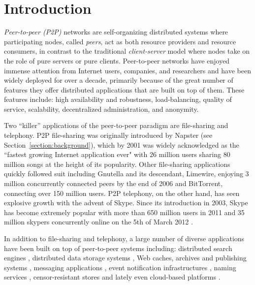 \section{Introduction}
\label{section:intro}

\emph{Peer-to-peer (P2P)} networks are self-organizing distributed systems where
participating nodes, called \emph{peers}, act as both resource providers and
resource consumers, in contrast to the traditional \emph{client-server} model
where nodes take on the role of pure servers or pure clients. Peer-to-peer
networks have enjoyed immense attention from Internet users, companies, and
researchers and have been widely deployed for over a decade, primarily because
of the great number of features they offer distributed applications that are
built on top of them. These features include:  high availability and robustness,
load-balancing, quality of service, scalability, decentralized administration,
and anonymity. 

Two ``killer'' applications of the peer-to-peer paradigm are 
file-sharing and telephony. P2P file-sharing was originally introduced by
Napster (see Section~\ref{section:background}), which by 2001 was widely
acknowledged as the ``fastest growing Internet application ever" with 26 million
users sharing 80 million songs at the height of its popularity. Other file-sharing 
applications quickly followed suit including Gnutella and its descendant,
Limewire, enjoying 3 million concurrently connected peers by the end of 2006
and BitTorrent, connecting over 150 million users. P2P telephony, on the
other hand, has seen
explosive growth with the advent of Skype. Since its introduction in 2003,
Skype has become extremely popular with more than 650 million users in 2011
\cite{skypetotalusers} and 35 million skypers concurrently online on the 5th of
March 2012 \cite{skypesymusers}.

In addition to file-sharing and telephony, a large number of diverse
applications have been built on top of peer-to-peer systems including:
distributed search engines \cite{yaci}, distributed data storage systems
\cite{kbc_oceanstore_2000,bdet_fsdfs_2000,dkkms_cfs_2001,dr_pastutility_2001,abc_farsite_2002,mmfc_ivy_2002,arla,agebh_dks_2003},
Web caches, archives and publishing systems
\cite{ird_squirrel_2002,bags_youserv_2002,wrc_publius_2000,wm_tangler_2001},
messaging applications \cite{threedegrees}, event notification infrastructures
\cite{rkcd_scribe_2001,cdkr_scribe_2002,agebh_dks_2003}, naming services
\cite{cmm_chorddns_2002}, censor-resistant stores \cite{cswh_freenet_2001} and
lately even cloud-based platforms \cite{mgpj_cloudsnap_2011}.


